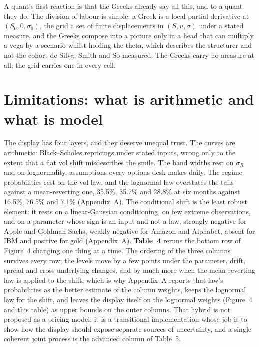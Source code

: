 \documentclass[11pt,a4paper]{article}
\begin{document}
A quant's first reaction is that the Greeks already say all this, and to a quant they do. The division of labour is simple: a Greek is a local partial derivative at $(S_0, 0, \sigma_0)$, the grid a set of finite displacements in $(S, u, \sigma)$ under a stated measure, and the Greeks compose into a picture only in a head that can multiply a vega by a scenario whilst holding the theta, which describes the structurer and not the cohort de Silva, Smith and So measured. The Greeks carry no measure at all; the grid carries one in every cell.

\section{Limitations: what is arithmetic and what is model}

\noindent The display has four layers, and they deserve unequal trust. The curves are arithmetic: Black--Scholes repricings under stated inputs, wrong only to the extent that a flat vol shift misdescribes the smile. The band widths rest on $\sigma_R$ and on lognormality, assumptions every options desk makes daily. The regime probabilities rest on the vol law, and the lognormal law overstates the tails against a mean-reverting one, 35.5\%, 35.7\% and 28.8\% at six months against 16.5\%, 76.5\% and 7.1\% (Appendix~A). The conditional shift is the least robust element: it rests on a linear-Gaussian conditioning, on few extreme observations, and on a parameter whose sign is an input and not a law, strongly negative for Apple and Goldman Sachs, weakly negative for Amazon and Alphabet, absent for IBM and positive for gold (Appendix~A). \textbf{Table~4} reruns the bottom row of Figure~4 changing one thing at a time. The ordering of the three columns survives every row; the levels move by a few points under the parameter, drift, spread and cross-underlying changes, and by much more when the mean-reverting law is applied to the shift, which is why Appendix~A reports that law's probabilities as the better estimate of the column weights, keeps the lognormal law for the shift, and leaves the display itself on the lognormal weights (Figure~4 and this table) as upper bounds on the outer columns. That hybrid is not proposed as a pricing model; it is a transitional implementation whose job is to show how the display should expose separate sources of uncertainty, and a single coherent joint process is the advanced column of Table~5.
\end{document}
